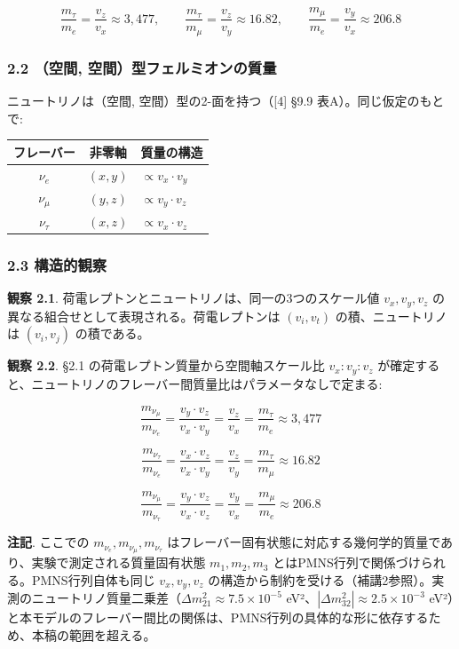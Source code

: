 \documentclass[
  a4paper,11pt]{ltjsarticle}
\newcounter{none} %
\begin{document}
\[\frac{m_\tau}{m_e} = \frac{v_z}{v_x} \approx 3{,}477, \qquad \frac{m_\tau}{m_\mu} = \frac{v_z}{v_y} \approx 16.82, \qquad \frac{m_\mu}{m_e} = \frac{v_y}{v_x} \approx 206.8\]

\subsubsection{2.2 （空間,
空間）型フェルミオンの質量}\label{ux7a7aux9593-ux7a7aux9593ux578bux30d5ux30a7ux30ebux30dfux30aaux30f3ux306eux8ceaux91cf}

ニュートリノは（空間, 空間）型の2-面を持つ（{[}4{]} §9.9
表A）。同じ仮定のもとで:

{\def\LTcaptype{none} %
\begin{longtable}[]{@{}ccl@{}}
\toprule\noalign{}
フレーバー & 非零軸 & 質量の構造 \\
\midrule\noalign{}
\endhead
\bottomrule\noalign{}
\endlastfoot
\(\nu_e\) & \((x, y)\) & \(\propto v_x \cdot v_y\) \\
\(\nu_\mu\) & \((y, z)\) & \(\propto v_y \cdot v_z\) \\
\(\nu_\tau\) & \((x, z)\) & \(\propto v_x \cdot v_z\) \\
\end{longtable}
}

\subsubsection{2.3 構造的観察}\label{ux69cbux9020ux7684ux89b3ux5bdf}

\textbf{観察 2.1}. 荷電レプトンとニュートリノは、同一の3つのスケール値
\(v_x, v_y, v_z\) の異なる組合せとして表現される。荷電レプトンは
\((v_i, v_t)\) の積、ニュートリノは \((v_i, v_j)\) の積である。

\textbf{観察 2.2}. §2.1 の荷電レプトン質量から空間軸スケール比
\(v_x : v_y : v_z\)
が確定すると、ニュートリノのフレーバー間質量比はパラメータなしで定まる:

\[\frac{m_{\nu_\mu}}{m_{\nu_e}} = \frac{v_y \cdot v_z}{v_x \cdot v_y} = \frac{v_z}{v_x} = \frac{m_\tau}{m_e} \approx 3{,}477\]

\[\frac{m_{\nu_\tau}}{m_{\nu_e}} = \frac{v_x \cdot v_z}{v_x \cdot v_y} = \frac{v_z}{v_y} = \frac{m_\tau}{m_\mu} \approx 16.82\]

\[\frac{m_{\nu_\mu}}{m_{\nu_\tau}} = \frac{v_y \cdot v_z}{v_x \cdot v_z} = \frac{v_y}{v_x} = \frac{m_\mu}{m_e} \approx 206.8\]

\textbf{注記}. ここでの \(m_{\nu_e}, m_{\nu_\mu}, m_{\nu_\tau}\)
はフレーバー固有状態に対応する幾何学的質量であり、実験で測定される質量固有状態
\(m_1, m_2, m_3\) とはPMNS行列で関係づけられる。PMNS行列自体も同じ
\(v_x, v_y, v_z\)
の構造から制約を受ける（補講2参照）。実測のニュートリノ質量二乗差（\(\Delta m^2_{21} \approx 7.5 \times 10^{-5}\)
eV²、\(|\Delta m^2_{32}| \approx 2.5 \times 10^{-3}\)
eV²）と本モデルのフレーバー間比の関係は、PMNS行列の具体的な形に依存するため、本稿の範囲を超える。
\end{document}
